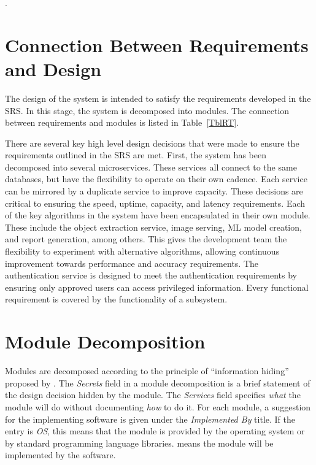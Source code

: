 \documentclass[12pt, titlepage]{article}
\begin{document}
\newpage 
.
\newpage 

\section{Connection Between Requirements and Design} \label{SecConnection}

The design of the system is intended to satisfy the requirements developed in
the SRS. In this stage, the system is decomposed into modules. The connection
between requirements and modules is listed in Table~\ref{TblRT}.

There are several key high level design decisions that were made to ensure the requirements outlined in the SRS are met. First, the system has been decomposed into several microservices. These services all connect to 
the same databases, but have the flexibility to operate on their own cadence. Each service can be mirrored by a duplicate service to improve capacity. These decisions are critical to ensuring the speed, uptime, capacity, and latency requirements.
Each of the key algorithms in the system have been encapsulated in their own module. These include the object extraction service, image serving, ML model creation, and report generation, among others. This gives the development team the flexibility to experiment with alternative algorithms, allowing continuous improvement towards performance and accuracy requirements.
The authentication service is designed to meet the authentication requirements by ensuring only approved users can access privileged information.
Every functional requirement is covered by the functionality of a subsystem.


\section{Module Decomposition} \label{SecMD}

Modules are decomposed according to the principle of ``information hiding''
proposed by \citet{ParnasEtAl1984}. The \emph{Secrets} field in a module
decomposition is a brief statement of the design decision hidden by the
module. The \emph{Services} field specifies \emph{what} the module will do
without documenting \emph{how} to do it. For each module, a suggestion for the
implementing software is given under the \emph{Implemented By} title. If the
entry is \emph{OS}, this means that the module is provided by the operating
system or by standard programming language libraries.  \emph{\progname{}} means the
module will be implemented by the \progname{} software.
\end{document}
